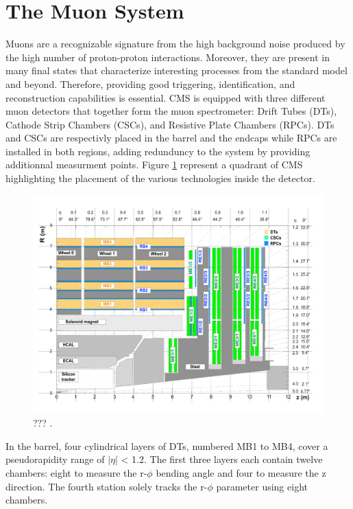   \section{The Muon System}

    Muons are a recognizable signature from the high background noise produced by the high number of proton-proton interactions. Moreover, they are present in many final states that characterize interesting processes from the standard model and beyond. Therefore, providing good triggering, identification, and reconstruction capabilities is essential. CMS is equipped with three different muon detectors that together form the muon spectrometer: Drift Tubes (DTs), Cathode Strip Chambers (CSCs), and Resistive Plate Chambers (RPCs). DTs and CSCs are respectivly placed in the barrel and the endcaps while RPCs are installed in both regions, adding redunduncy to the system by providing additionnal measurment points. Figure \ref{fig:I-3-muons} represent a quadrant of CMS highlighting the placement of the various technologies inside the detector. \\

    \begin{figure}[h!]
      \centering
      \includegraphics[width=\textwidth]{img/I-3-cms/muons.pdf}
      \caption{??? \cite{1748-0221-3-08-S08004}.}
      \label{fig:I-3-muons}
    \end{figure}

    In the barrel, four cylindrical layers of DTs, numbered MB1 to MB4, cover a pseudorapidity range of $ | \eta | $ < 1.2. The first three layers each contain twelve chambers: eight to measure the r-$\phi$ bending angle and four to measure the z direction. The fourth station solely tracks the r-$\phi$ parameter using eight chambers. \\

